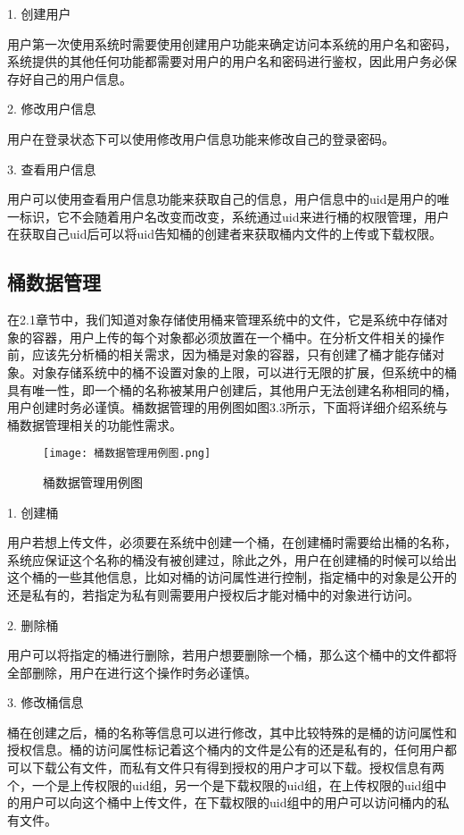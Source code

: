 1. 创建用户

用户第一次使用系统时需要使用创建用户功能来确定访问本系统的用户名和密码，系统提供的其他任何功能都需要对用户的用户名和密码进行鉴权，因此用户务必保存好自己的用户信息。

2. 修改用户信息

用户在登录状态下可以使用修改用户信息功能来修改自己的登录密码。

3. 查看用户信息

用户可以使用查看用户信息功能来获取自己的信息，用户信息中的uid是用户的唯一标识，它不会随着用户名改变而改变，系统通过uid来进行桶的权限管理，用户在获取自己uid后可以将uid告知桶的创建者来获取桶内文件的上传或下载权限。

\subsection{桶数据管理}
在2.1章节中，我们知道对象存储使用桶来管理系统中的文件，它是系统中存储对象的容器，用户上传的每个对象都必须放置在一个桶中。在分析文件相关的操作前，应该先分析桶的相关需求，因为桶是对象的容器，只有创建了桶才能存储对象。对象存储系统中的桶不设置对象的上限，可以进行无限的扩展，但系统中的桶具有唯一性，即一个桶的名称被某用户创建后，其他用户无法创建名称相同的桶，用户创建时务必谨慎。桶数据管理的用例图如图3.3所示，下面将详细介绍系统与桶数据管理相关的功能性需求。

\begin{figure}[h]
    \centering
    \texttt{[image: 桶数据管理用例图.png]}
    \caption{桶数据管理用例图}
\end{figure}

1. 创建桶

用户若想上传文件，必须要在系统中创建一个桶，在创建桶时需要给出桶的名称，系统应保证这个名称的桶没有被创建过，除此之外，用户在创建桶的时候可以给出这个桶的一些其他信息，比如对桶的访问属性进行控制，指定桶中的对象是公开的还是私有的，若指定为私有则需要用户授权后才能对桶中的对象进行访问。

2. 删除桶

用户可以将指定的桶进行删除，若用户想要删除一个桶，那么这个桶中的文件都将全部删除，用户在进行这个操作时务必谨慎。

3. 修改桶信息

桶在创建之后，桶的名称等信息可以进行修改，其中比较特殊的是桶的访问属性和授权信息。桶的访问属性标记着这个桶内的文件是公有的还是私有的，任何用户都可以下载公有文件，而私有文件只有得到授权的用户才可以下载。授权信息有两个，一个是上传权限的uid组，另一个是下载权限的uid组，在上传权限的uid组中的用户可以向这个桶中上传文件，在下载权限的uid组中的用户可以访问桶内的私有文件。

